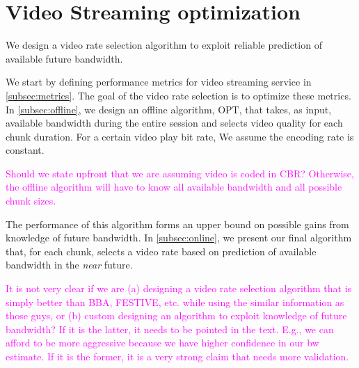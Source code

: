 \newcommand{\rks}[1]{\textcolor{magenta}{#1}}
\section{Video Streaming optimization}\label{sec:optimization}

We design a video rate selection algorithm to exploit reliable
prediction of available future bandwidth.


We start by defining performance metrics for video streaming service in
\autoref{subsec:metrics}. The goal of the video rate selection is to 
optimize these metrics.
In \autoref{subsec:offline}, we design an offline algorithm, OPT, that
takes, as input, available bandwidth during the entire session and
selects video quality for each chunk duration. For a certain video play bit rate, We assume the encoding rate is
constant.

\rks{Should we state upfront that we are assuming video is coded in CBR?
  Otherwise, the offline algorithm will have to know all
  available bandwidth and all possible chunk sizes.}
  
The performance of this algorithm forms an upper bound on possible
gains from knowledge of future bandwidth.
In \autoref{subsec:online}, we present our final algorithm that, for
each chunk, selects a video rate  based on prediction of 
available bandwidth in the \emph{near} future.

\rks{It is not very clear if we are (a) designing a video rate
  selection algorithm that is simply better than BBA, FESTIVE,
  etc. while using the similar information as those guys,
  or (b) custom designing an algorithm to exploit knowledge of future
  bandwidth? If it is the latter, it needs to be pointed in the
  text. E.g., we can afford to be more aggressive because we have
  higher confidence in our bw estimate. If it is the former, it is a
  very strong claim that needs more validation.}


